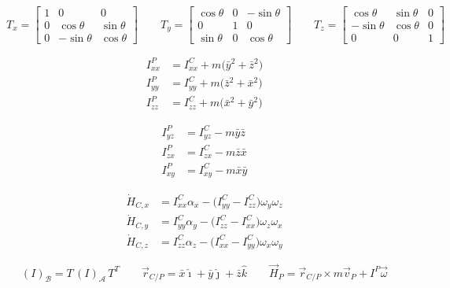 \documentclass{article}
\begin{document}
\section*{}

\[
T_x=
\begin{bmatrix}
1 & 0 & 0 \\
0 & \cos\theta & \sin\theta \\
0 & -\sin\theta & \cos\theta
\end{bmatrix}
\qquad
T_y=
\begin{bmatrix}
\cos\theta & 0 & -\sin\theta \\
0 & 1 & 0 \\
\sin\theta & 0 & \cos\theta
\end{bmatrix}
\qquad
T_z=
\begin{bmatrix}
\cos\theta & \sin\theta & 0 \\
-\sin\theta & \cos\theta & 0 \\
0 & 0 & 1
\end{bmatrix}
\]

\begin{multicols}{3}

\[
\begin{split}
    I_{xx}^P&=I_{xx}^C+m\bigl(\bar y^2+\bar z^2\bigr) \\
    I_{yy}^P&=I_{yy}^C+m\bigl(\bar z^2+\bar x^2\bigr) \\
    I_{zz}^P&=I_{zz}^C+m\bigl(\bar x^2+\bar y^2\bigr)
\end{split}
\]

\columnbreak

\[
\begin{split}
    I_{yz}^P&=I_{yz}^C-m\bar y\bar z \\
    I_{zx}^P&=I_{zx}^C-m\bar z\bar x \\
    I_{xy}^P&=I_{xy}^C-m\bar x\bar y
\end{split}
\]

\columnbreak

\[
\begin{split}
    \dot H_{C,x}&=I_{xx}^C\alpha_x-\bigl(I_{yy}^C-I_{zz}^C\bigr)\omega_y\omega_z \\
    \dot H_{C,y}&=I_{yy}^C\alpha_y-\bigl(I_{zz}^C-I_{xx}^C\bigr)\omega_z\omega_x \\
    \dot H_{C,z}&=I_{zz}^C\alpha_z-\bigl(I_{xx}^C-I_{yy}^C\bigr)\omega_x\omega_y
\end{split}
\]

\end{multicols}

\[
(I)_\mathcal B=T\,(I)_\mathcal A\,T^T \qquad
\vec r_{C/P}=\bar x\hat\imath+\bar y\hat\jmath+\bar z\hat k \qquad
\vec H_P=\vec r_{C/P}\times m\vec v_P+I^P\vec\omega
\]
\end{document}
